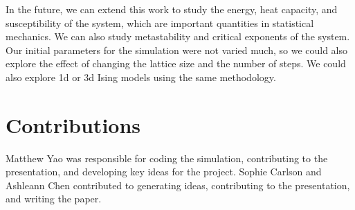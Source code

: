 \documentclass[
 reprint,
 amsmath,
 amssymb,
 aps,
]{revtex4-2}
\begin{document}
In the future, we can extend this work to study the energy,
heat capacity, and susceptibility of the system,
which are important quantities in statistical mechanics.
We can also study metastability and critical exponents of the system.
Our initial parameters for the simulation were not varied much,
so we could also explore the effect of changing the lattice size and 
the number of steps. We could also explore 1d or 3d Ising models using the 
same methodology.


\section{Contributions}

Matthew Yao was responsible for coding the simulation, contributing to the presentation, and developing key ideas for the project. Sophie Carlson and Ashleann Chen contributed to generating ideas, contributing to the presentation, and writing the paper.


\appendix
\end{document}
